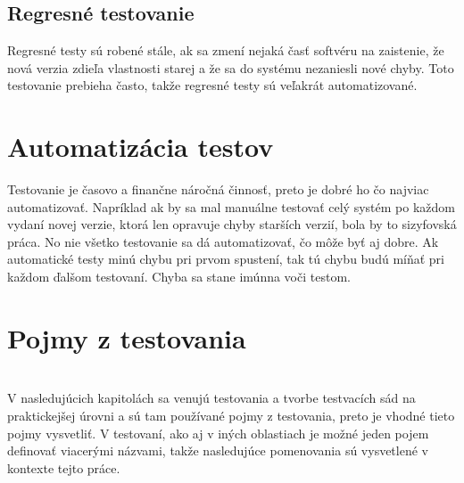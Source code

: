 \subsection*{Regresné testovanie}
\label{regression_tests}
Regresné testy sú robené stále, ak sa zmení nejaká časť softvéru na zaistenie, že nová verzia zdieľa vlastnosti starej a že sa do systému nezaniesli nové chyby.
Toto testovanie prebieha často, takže regresné testy sú veľakrát automatizované.

\section{Automatizácia testov}
\label{tests_automatization}
Testovanie je časovo a finančne náročná činnosť, preto je dobré ho čo najviac automatizovať.
Napríklad ak by sa mal manuálne testovať celý systém po každom vydaní novej verzie, ktorá len opravuje chyby starších verzií, bola by to sizyfovská práca.
No nie všetko testovanie sa dá automatizovať, čo môže byť aj dobre.
Ak automatické testy minú chybu pri prvom spustení, tak tú chybu budú míňať pri každom ďalšom testovaní.
Chyba sa stane imúnna voči testom.

\section{Pojmy z testovania}
\label{pojmy_testovanie}
\\
V nasledujúcich kapitolách sa venujú testovania a tvorbe testvacích sád na praktickejšej úrovni a sú tam používané pojmy z testovania, preto je vhodné tieto pojmy vysvetliť.
V testovaní, ako aj v iných oblastiach je možné jeden pojem definovať viacerými názvami, takže nasledujúce pomenovania sú vysvetlené v kontexte tejto práce.

